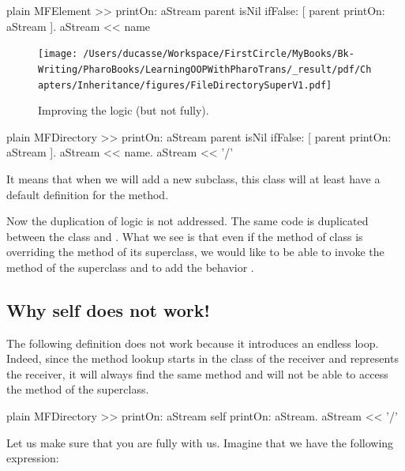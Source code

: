 \documentclass[10pt,twoside,english]{_support/latex/sbabook/sbabook}
\begin{document}
\begin{displaycode}{plain}
MFElement >> printOn: aStream
	parent isNil 
		ifFalse: [ parent printOn: aStream ].
	aStream << name
\end{displaycode}


\begin{figure}

\begin{center}
\texttt{[image: /Users/ducasse/Workspace/FirstCircle/MyBooks/Bk-Writing/PharoBooks/LearningOOPWithPharoTrans/\_result/pdf/Chapters/Inheritance/figures/FileDirectorySuperV1.pdf]}\caption{Improving the logic (but not fully).\label{fig:FileDirectorySuperV1}}\end{center}
\end{figure}


\begin{displaycode}{plain}
MFDirectory >> printOn: aStream
	parent isNil 
		ifFalse: [ parent printOn: aStream ].
	aStream << name.
	aStream << '/'
\end{displaycode}

It means that when we will add a new subclass, this class will at least have a default definition for the  method. 

Now the duplication of logic is not addressed. The same code is duplicated between the class  and . What we see is that even if the method  of class  is overriding the method of its superclass, we would like to be able to invoke the method of the superclass  and to add the behavior . 
\subsection{Why self does not work!}
The following definition does not work because it introduces an endless loop. Indeed, since the method lookup starts in the class of the receiver and  represents the receiver, it will always find the same method and will not be able to access the method of the superclass.

\begin{displaycode}{plain}
MFDirectory >> printOn: aStream
	self printOn: aStream.
	aStream << '/'
\end{displaycode}

Let us make sure that you are fully with us. Imagine that we have the following expression: 
\end{document}
